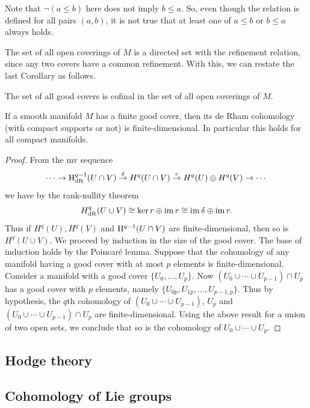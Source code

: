 Note that $\lnot (a\leq b)$ here does not imply $b\leq a$. So, even though the relation is defined for all pairs $(a,b)$, it is not true that at least one of $a\leq b$ or $b\leq a$ always holds.
    
The set of all open coverings of $M$ is a directed set with the refinement relation, since any two covers have a common refinement. With this, we can restate the last Corollary as follows.

\begin{cor}
    The set of all good covers is cofinal in the set of all open coverings of $M$.
\end{cor}

\begin{prop}
    If a smooth manifold $M$ has a finite good cover, then its de Rham cohomology (with compact supports or not) is finite-dimensional. In particular this holds for all compact manifolds.
\end{prop}
\begin{proof}
     From the \gls{mv} sequence 
     \[\cdots\to \mathrm{H}^{q-1}_{\rm dR}(U\cap V)\overset{\delta}\to H^q(U\cap V)\overset{r}\to H^q(U)\oplus H^q(V)\to\cdots\]
     we have by the rank-nullity theorem
     \[H^q_{\rm dR}(U\cup V)\cong \ker r\oplus\operatorname{im} r\cong \operatorname{im} \delta\oplus\operatorname{im} r.\]
     Thus if $H^q(U), H^q(V)$ and $\mathrm{H}^{q-1}(U\cap V)$ are finite-dimensional, then so is $H^q(U\cup V)$.
     We proceed by induction in the size of the good cover. The base of induction holds by the Poincar\'e lemma. Suppose that the cohomology of any manifold having a good cover with at most $p$ elements is finite-dimensional. Consider a manifold with a good cover $\{U_0,\ldots,U_{p}\}$. Now $(U_0\cup \cdots \cup U_{p-1})\cap U_{p}$ has a good cover with $p$ elements, namely $\{U_{0p},U_{1p},\ldots,U_{p-1,p}\}$. Thus by hypothesis, the $q$th cohomology of $(U_0\cup \cdots \cup U_{p-1})$, $U_p$ and $(U_0\cup \cdots \cup U_{p-1})\cap U_{p}$ are finite-dimensional. Using the above result for a union of two open sets, we conclude that so is the cohomology of $U_0\cup \cdots\cup U_p$.
\end{proof}


\subsection{Hodge theory}


\subsection{Cohomology of Lie groups}


